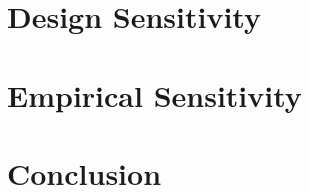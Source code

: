 \documentclass[12pt]{article}
\begin{document}
\section{Design Sensitivity \label{sec:dsens}}


\section{Empirical Sensitivity \label{sec:esens}}


\section{Conclusion \label{sec:conclusion}}


\clearpage
\singlespacing




\newpage

%
\end{document}
